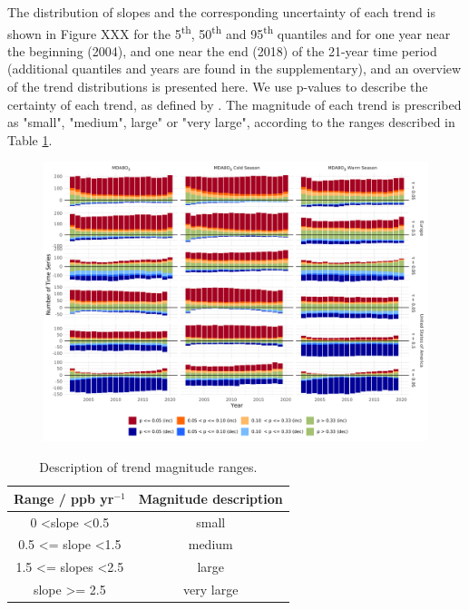 \documentclass[journal abbreviation, manuscript]{copernicus}
\begin{document}
The distribution of slopes and the corresponding uncertainty of each trend is shown in Figure XXX for the 5\textsuperscript{th}, 50\textsuperscript{th} and 95\textsuperscript{th} quantiles and for one year near the beginning (2004), and one near the end (2018) of the 21-year time period (additional quantiles and years are found in the supplementary), and an overview of the trend distributions is presented here. We use p-values to describe the certainty of each trend, as defined by \cite{chang2023guidancenotebeststatistical}. The magnitude of each trend is prescribed as "small", "medium", large" or "very large", according to the ranges described in Table \ref{tab:magnitude_description_table}.

\begin{figure}[h!]
\centering
\includegraphics[width=\textwidth]{figures/paper_figures/signifcance_bars.pdf}
\caption{}
\label{fig:o3_map_eu_mda8}
\end{figure}


\begin{table}[h]
\caption{Description of trend magnitude ranges.}
\begin{tabular}{c|c}
Range / ppb yr$^{-1}$                 & Magnitude description \\ \hline
0 \textless slope \textless 0.5       & small                 \\
0.5 \textless{}= slope \textless 1.5  & medium              \\
1.5 \textless{}= slopes \textless 2.5 & large                 \\
slope \textgreater{}= 2.5             & very large           
\end{tabular}
\label{tab:magnitude_description_table}
\end{table}
\end{document}
